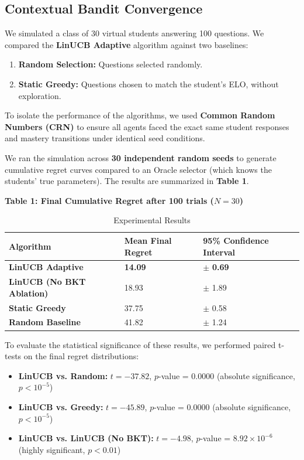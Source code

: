\documentclass{article}
\begin{document}
\subsection{Contextual Bandit Convergence}
We simulated a class of 30 virtual students answering 100 questions. We compared the \textbf{LinUCB Adaptive} algorithm against two baselines:
\begin{enumerate}
    \item \textbf{Random Selection:} Questions selected randomly.
    \item \textbf{Static Greedy:} Questions chosen to match the student's ELO, without exploration.
\end{enumerate}

To isolate the performance of the algorithms, we used \textbf{Common Random Numbers (CRN)} to ensure all agents faced the exact same student responses and mastery transitions under identical seed conditions.

We ran the simulation across \textbf{30 independent random seeds} to generate cumulative regret curves compared to an Oracle selector (which knows the students' true parameters). The results are summarized in \textbf{Table 1}.

\textbf{Table 1: Final Cumulative Regret after 100 trials ($N=30$)}

\begin{table}[h]
\centering
\begin{tabular}{lll}
\toprule
\textbf{Algorithm} & \textbf{Mean Final Regret} & \textbf{95\% Confidence Interval} \\
\midrule
\textbf{LinUCB Adaptive} & \textbf{14.09} & $\pm$ \textbf{0.69} \\
\textbf{LinUCB (No BKT Ablation)} & 18.93 & $\pm$ 1.89 \\
\textbf{Static Greedy} & 37.75 & $\pm$ 0.58 \\
\textbf{Random Baseline} & 41.82 & $\pm$ 1.24 \\
\bottomrule
\end{tabular}
\caption{Experimental Results}
\end{table}
To evaluate the statistical significance of these results, we performed paired t-tests on the final regret distributions:
\begin{itemize}
    \item \textbf{LinUCB vs. Random:} $t = -37.82$, $p$-value = $0.0000$ (absolute significance, $p < 10^{-5}$)
    \item \textbf{LinUCB vs. Greedy:} $t = -45.89$, $p$-value = $0.0000$ (absolute significance, $p < 10^{-5}$)
    \item \textbf{LinUCB vs. LinUCB (No BKT):} $t = -4.98$, $p$-value = $8.92 \times 10^{-6}$ (highly significant, $p < 0.01$)
\end{itemize}
\end{document}
